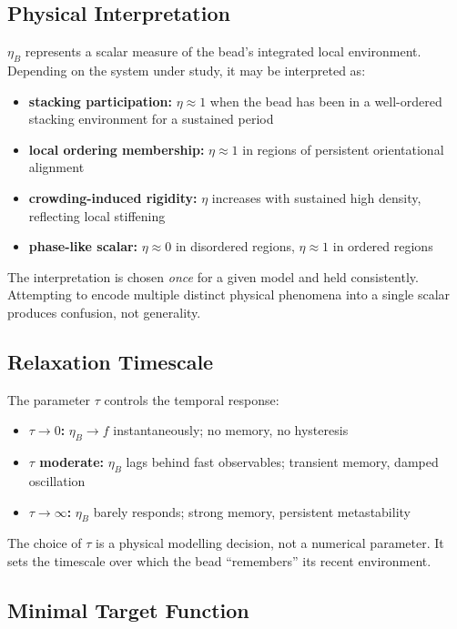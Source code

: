 \documentclass[11pt]{article}
\begin{document}
\subsection{Physical Interpretation}

$\eta_B$ represents a scalar measure of the bead's integrated local
environment.  Depending on the system under study, it may be interpreted as:
\begin{itemize}
    \item \textbf{stacking participation:} $\eta \approx 1$ when the bead
          has been in a well-ordered stacking environment for a sustained
          period
    \item \textbf{local ordering membership:} $\eta \approx 1$ in regions
          of persistent orientational alignment
    \item \textbf{crowding-induced rigidity:} $\eta$ increases with
          sustained high density, reflecting local stiffening
    \item \textbf{phase-like scalar:} $\eta \approx 0$ in disordered regions,
          $\eta \approx 1$ in ordered regions
\end{itemize}

The interpretation is chosen \emph{once} for a given model and held
consistently.  Attempting to encode multiple distinct physical phenomena into
a single scalar produces confusion, not generality.

\subsection{Relaxation Timescale}

The parameter $\tau$ controls the temporal response:
\begin{itemize}
    \item \textbf{$\tau \to 0$:} $\eta_B \to f$ instantaneously;
          no memory, no hysteresis
    \item \textbf{$\tau$ moderate:} $\eta_B$ lags behind fast observables;
          transient memory, damped oscillation
    \item \textbf{$\tau \to \infty$:} $\eta_B$ barely responds;
          strong memory, persistent metastability
\end{itemize}

The choice of $\tau$ is a physical modelling decision, not a numerical
parameter.  It sets the timescale over which the bead ``remembers'' its
recent environment.

\subsection{Minimal Target Function}
\end{document}
